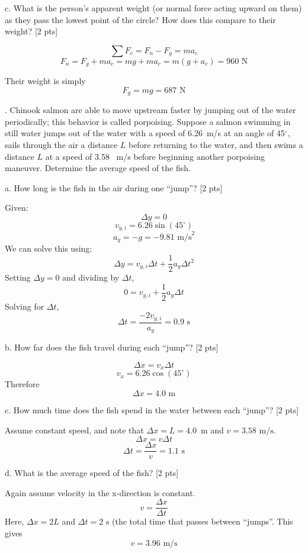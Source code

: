 \documentclass[11pt,letterpaper]{article}
\newcommand{\sol}[1]{{\color{White} #1}} %
\begin{document}
c. What is the person's apparent weight (or normal force acting upward on them) as they pass the lowest point of the circle? How does this compare to their weight? [2 pts]

\sol{
$$\sum F_c = F_n - F_g = ma_c$$
$$F_n = F_g + ma_c = mg+ma_c = m(g+a_c) = \boxed{960\mbox{ N}}$$

Their weight is simply 
$$F_g = mg = \boxed{687\mbox{ N}}$$

}




. Chinook salmon are able to move upstream faster by jumping out of the water periodically; this behavior is called porpoising. Suppose a salmon swimming in still water jumps out of the water with a speed of 6.26~m/s at an angle of 45$^\circ$, sails through the air a distance $L$ before returning to the water, and then swims a distance $L$ at a speed of 3.58~ m/s before beginning another porpoising maneuver. Determine the average speed of the fish. 

a. How long is the fish in the air during one ``jump''? [2 pts]

\sol{
Given:
$$\Delta y = 0$$
$$v_{y,i} = 6.26\sin(45^\circ)$$
$$a_y = -g = -9.81\mbox{ m/s}^2$$
We can solve this using:
$$\Delta y = v_{y,i}\Delta t + \frac{1}{2}a_y\Delta t^2$$
Setting $\Delta y=0$ and dividing by $\Delta t$,
$$0 = v_{y,i} + \frac{1}{2}a_y\Delta t$$
Solving for $\Delta t$,
$$\Delta t = \frac{-2v_{y,i}}{a_y} = \boxed{0.9\mbox{ s}}$$
}
\vspace{2cm}

b. How far does the fish travel during each ``jump''? [2 pts]

\sol{
$$\Delta x = v_x\Delta t$$
$$v_x = 6.26\cos(45^\circ)$$
Therefore
$$\Delta x = \boxed{4.0\mbox{ m}}$$
} 
\vspace{1cm}

c. How much time does the fish spend in the water between each ``jump''? [2 pts]

\sol{Assume constant speed, and note that $\Delta x = L=4.0$~m and $v=3.58\mbox{ m/s}$.
$$\Delta x = v\Delta t$$
$$\Delta t = \frac{\Delta x}{v} = \boxed{1.1\mbox{ s}}$$
}
\vspace{1cm}

d. What is the average speed of the fish? [2 pts]

\sol{Again assume velocity in the x-direction is constant.
$$v = \frac{\Delta x}{\Delta t}$$
Here, $\Delta x = 2L$ and $\Delta t = 2\mbox{ s}$ (the total time that passes between ``jumps''. This gives
$$\boxed{v = 3.96\mbox{ m/s}}$$
}
\end{document}
